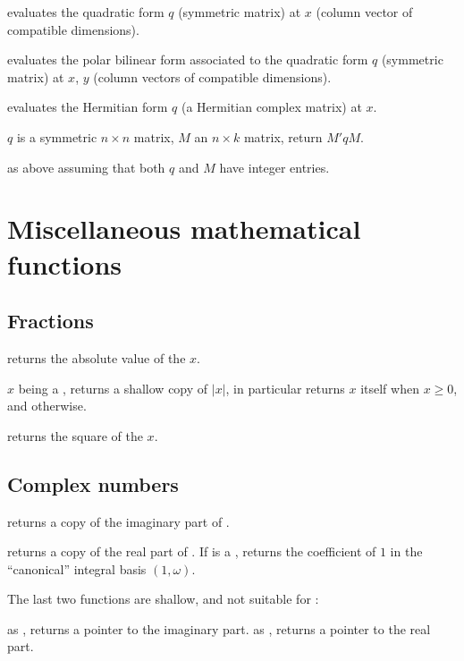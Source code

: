  evaluates the quadratic form
$q$ (symmetric matrix) at $x$ (column vector of compatible dimensions).

 evaluates the polar bilinear form
associated to the quadratic form $q$ (symmetric matrix) at $x$, $y$ (column
vectors of compatible dimensions).

 evaluates the Hermitian form $q$
(a Hermitian complex matrix) at $x$.

 $q$ is a symmetric $n\times n$ matrix,
$M$ an $n\times k$ matrix, return $M' q M$.

 as above assuming that both
$q$ and $M$ have integer entries.

\newpage
\chapter{Miscellaneous mathematical functions}

\section{Fractions}

 returns the absolute value of the  $x$.

 $x$ being a , returns a shallow
copy of $|x|$, in particular returns $x$ itself when $x \geq 0$, and
 otherwise.

 returns the square of the  $x$.

\section{Complex numbers}

 returns a copy of the imaginary part of .

 returns a copy of the real part of . If 
is a , returns the coefficient of $1$ in the ``canonical'' integral
basis $(1,\omega)$.

The last two functions are shallow, and not suitable for :

 as , returns a pointer to the imaginary
part.
 as , returns a pointer to the real part.

